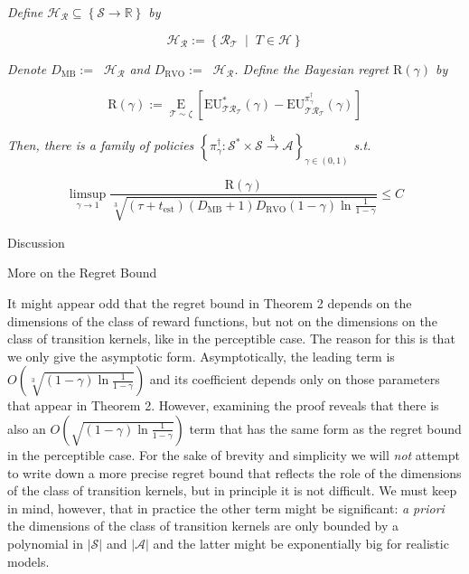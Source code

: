 \documentclass[a4paper]{article}
\newcommand{\Co}[1]{}
\newcommand{\AP}[1]{\left(#1\right)}
\newcommand{\AB}[1]{\left[#1\right]}
\newcommand{\AC}[1]{\left\{#1\right\}}
\newcommand{\ACM}[2]{\left\{#1\;\middle\vert\;#2\right\}}
\newcommand{\Abs}[1]{\left\vert #1 \right\vert}
\newcommand{\Ea}[2]{\underset{#1}{\operatorname{E}}\AB{#2}}
\newcommand{\Reals}{\mathbb{R}}
\newcommand{\K}{\xrightarrow{\mathrm{k}}}
\newcommand{\St}{\mathcal{S}}
\newcommand{\A}{\mathcal{A}}
\newcommand{\R}{\mathcal{R}}
\newcommand{\T}{\mathcal{T}}
\newcommand{\Hy}{\mathcal{H}}
\DeclareMathOperator{\RVO}{\dim_{RVO}}
\DeclareMathOperator{\MB}{\dim_{MB}}
\newcommand{\DRVO}{D_{\mathrm{RVO}}}
\newcommand{\DMB}{D_{\mathrm{MB}}}
\newcommand{\Est}{\mathrm{est}}
\newcommand{\EU}{\mathrm{EU}}
\newcommand{\Reg}{\mathrm{R}}
\begin{document}
\textit{Define $\Hy_\R\subseteq\AC{\St\rightarrow\Reals}$ by}\Co{i}

$$\Hy_\R:=\ACM{\R_\T}{T\in\Hy}$$

\textit{Denote $\DMB:=\MB{\Hy_\R}$ and $\DRVO:=\RVO{\Hy_\R}$. Define the Bayesian regret $\Reg(\gamma)$ by}

$$\Reg(\gamma):=\Ea{\T\sim\zeta}{\EU^*_{\T\R_\T}(\gamma)-\EU^{\pi^\dagger_\gamma}_{\T\R_\T}(\gamma)}$$

\textit{Then, there is a family of policies $\AC{\pi^\dagger_\gamma:\St^*\times\St\K\A}_{\gamma\in(0,1)}$ s.t.}\Co{i}

$$\limsup_{\gamma \rightarrow 1}\frac{\Reg(\gamma)}{\sqrt[3]{\AP{\tau+t_{\Est}}\AP{\DMB+1}\DRVO(1-\gamma)\ln{\frac{1}{1-\gamma}}}}\leq C$$

\begin{Huge}Discussion\end{Huge}

\begin{Large}More on the Regret Bound\end{Large}

It might appear odd that the regret bound in Theorem 2 depends on the dimensions of the class of reward functions, but not on the dimensions on the class of transition kernels, like in the perceptible case. The reason for this is that we only give the asymptotic form. Asymptotically, the leading term is $O\AP{\sqrt[3]{\AP{1-\gamma}\ln{\frac{1}{1-\gamma}}}}$ and its coefficient depends only on those parameters that appear in Theorem 2. However, examining the proof reveals that there is also an $O\AP{\sqrt{\AP{1-\gamma}\ln{\frac{1}{1-\gamma}}}}$ term that has the same form as the regret bound in the perceptible case. For the sake of brevity and simplicity we will \textit{not}\Co{i} attempt to write down a more precise regret bound that reflects the role of the dimensions of the class of transition kernels, but in principle it is not difficult. We must keep in mind, however, that in practice the other term might be significant: \textit{a priori}\Co{i} the dimensions of the class of transition kernels are only bounded by a polynomial in $\Abs{\St}$ and $\Abs{\A}$ and the latter might be exponentially big for realistic models. 

\Co{In fact, for the MDP setting we examine, the bound we give can probably be substantially improved. This is because we exploit the ability to measure an estimate of the reward, but we don't exploit the fact that knowing the transition kernel would make the reward effectively perceptible. For example, our ball sorting robot could measure the density of gold and silver once and consider it known thereafter (it's slightly worse if the measurement involves error, but not by that much). However, we mostly consider Theorem 2 to be a warm-up towards the POMDP setting, in which the reward never becomes effectively perceptible. In that setting, we suspect that $O\AP{\sqrt[3]{1-\gamma}}$ might be the best possible $\gamma$ dependence, up to logarithmic factors.}
\end{document}

